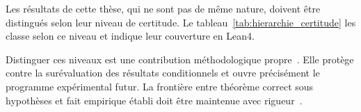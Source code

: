 \begin{sloppypar}
Les r\'esultats de cette th\`ese, qui ne sont pas de m\^eme nature, doivent
\^etre distingu\'es selon leur niveau de
certitude. Le tableau~\ref{tab:hierarchie_certitude} les classe selon ce niveau et
indique leur couverture en Lean4.



Distinguer ces niveaux est une contribution
m\'ethodologique propre~\cite{Nosek2015,IOC2019}. Elle prot\`ege contre
la sur\'evaluation des r\'esultats conditionnels et ouvre pr\'ecis\'ement
le programme exp\'erimental futur. La fronti\`ere entre \og th\'eor\`eme
correct sous hypoth\`eses \fg{} et \og fait empirique \'etabli \fg{} doit
\^etre maintenue avec rigueur~\cite{Lakatos1978}.
\end{sloppypar}

